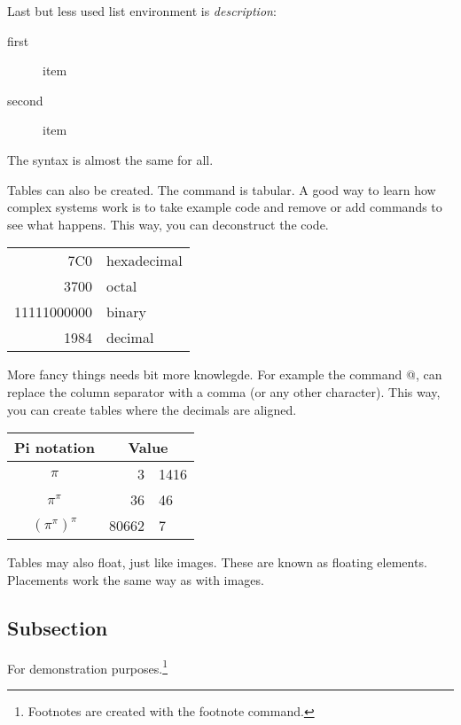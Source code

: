 \documentclass[12pt, titlepage, a4paper]{article}  %
\begin{document}
Last but less used list environment is {\it description}:

\begin{description}
\item[first] item
\item[second] item
\end{description}

The syntax is almost the same for all.

Tables can also be created. The command is tabular. A good way to learn how complex systems work is to take example code and remove or add commands to see what happens. This way, you can deconstruct the code. \newline



\begin{tabular}{| r | l |}     %
\hline    %
7C0 & hexadecimal \\    %
3700 & octal \\ \cline{2-2}    %
11111000000 & binary \\
\hline \hline    %
1984 & decimal \\
\hline    %
\end{tabular}
\newline

More fancy things needs bit more knowlegde.
For example the command @{,} can replace the column separator with a comma (or any other character). This way, you can create tables where the decimals are aligned.

\begin{tabular}{c r @{,} l}
Pi notation     &
\multicolumn{2}{c}{Value} \\        %
\hline
$\pi$               & 3&1416  \\
$\pi^{\pi}$         & 36&46   \\
$(\pi^{\pi})^{\pi}$ & 80662&7 \\
\end{tabular}

Tables may also float, just like images. These are known as floating elements. Placements work the same way as with images.

\subsection{Subsection}
For demonstration purposes.\footnote{Footnotes are created with the footnote command.}
\end{document}
